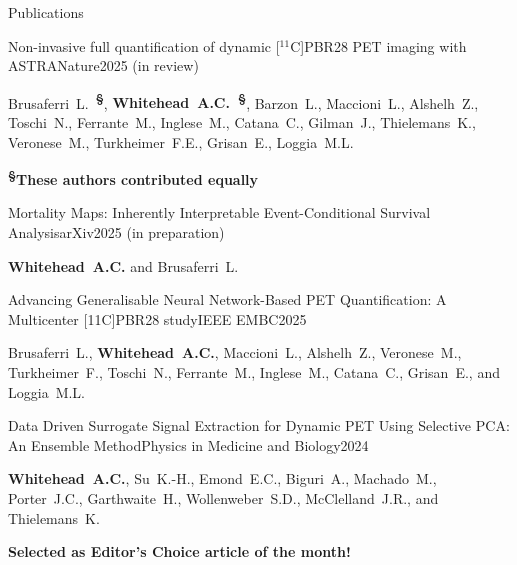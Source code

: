 \documentclass{cv}
\begin{document}
    \begin{spacing}{1.0}
        \begin{rSection}{Publications}
            \item \begin{rSubsection}{Non-invasive full quantification of dynamic [$^{11}$C]PBR28 PET imaging with ASTRA}{}{Nature}{2025 (in review)}
                \item  Brusaferri~L.~\textbf{\textsuperscript{\S}}, \textbf{Whitehead~A.C.~\textsuperscript{\S}}, Barzon~L., Maccioni~L., Alshelh~Z., Toschi~N., Ferrante~M., Inglese~M., Catana~C., Gilman~J., Thielemans~K., Veronese~M., Turkheimer~F.E., Grisan~E., Loggia~M.L. \\
                \vspace{-0.5cm}
                \item \textbf{\textsuperscript{\S}These authors contributed equally} \\
            \end{rSubsection}
            
            \item \begin{rSubsection}{Mortality Maps: Inherently Interpretable Event-Conditional Survival Analysis}{}{arXiv}{2025 (in preparation)}
                \item \textbf{Whitehead~A.C.} and Brusaferri~L. \\
            \end{rSubsection}
            
            \item \begin{rSubsection}{Advancing Generalisable Neural Network-Based PET Quantification: A Multicenter [11C]PBR28 study}{}{IEEE EMBC}{2025}
                \item Brusaferri~L., \textbf{Whitehead~A.C.}, Maccioni~L., Alshelh~Z., Veronese~M., Turkheimer~F., Toschi~N., Ferrante~M., Inglese~M., Catana~C., Grisan~E., and Loggia~M.L. \\
            \end{rSubsection}
            
            \item \begin{rSubsection}{Data Driven Surrogate Signal Extraction for Dynamic PET Using Selective PCA: An Ensemble Method}{}{Physics in Medicine and Biology}{2024}
                \item \textbf{Whitehead~A.C.}, Su~K.-H., Emond~E.C., Biguri~A., Machado~M., Porter~J.C., Garthwaite~H., Wollenweber~S.D., McClelland~J.R., and Thielemans~K. \\
                \vspace{-0.5cm}
                \item \textbf{Selected as Editor’s Choice article of the month!} \\
            \end{rSubsection}
            

\end{rSection}
\end{spacing}
\end{document}

